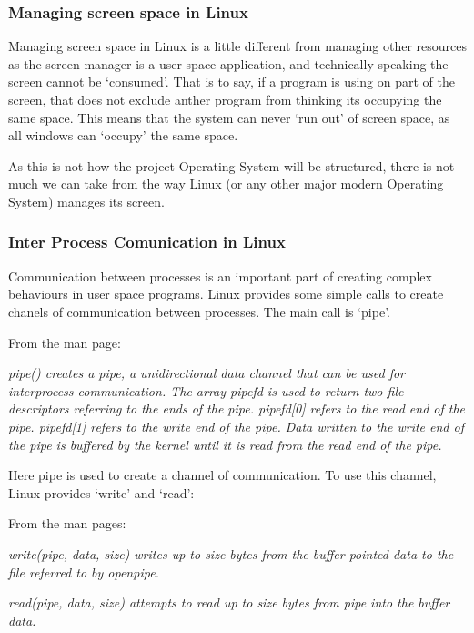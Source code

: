 \documentclass[a4paper]{report}
\begin{document}
\subsubsection*{Managing screen space in Linux}

Managing screen space in Linux is a little different from managing other resources as the screen manager is a user space application, and technically speaking the screen cannot be `consumed'. That is to say, if a program is using on part of the screen, that does not exclude anther program from thinking its occupying the same space. This means that the system can never `run out' of screen space, as all windows can `occupy' the same space.

As this is not how the project Operating System will be structured, there is not much we can take from the way Linux (or any other major modern Operating System) manages its screen.


\subsubsection*{Inter Process Comunication in Linux}

Communication between processes is an important part of creating complex behaviours in user space programs. Linux provides some simple calls to create chanels of communication between processes. The main call is `pipe'.

From the man page:

\textit{pipe() creates a pipe, a unidirectional data channel that can be used for interprocess communication. The array pipefd is used to return two file descriptors referring to the ends of the pipe. pipefd[0] refers to the read end of the pipe. pipefd[1] refers to the write end of the pipe. Data written to the write end of the pipe is buffered by the kernel until it is read from the read end of the pipe.} \cite{manPipe}

Here pipe is used to create a channel of communication. To use this channel, Linux provides `write' and `read':

From the man pages:

\textit{write(pipe, data, size) writes up to size bytes from the buffer pointed data to the file referred to by openpipe.} \cite{manWrite}

\textit{read(pipe, data, size) attempts to read up to size bytes from pipe into the buffer data.} \cite{manRead}
\end{document}
